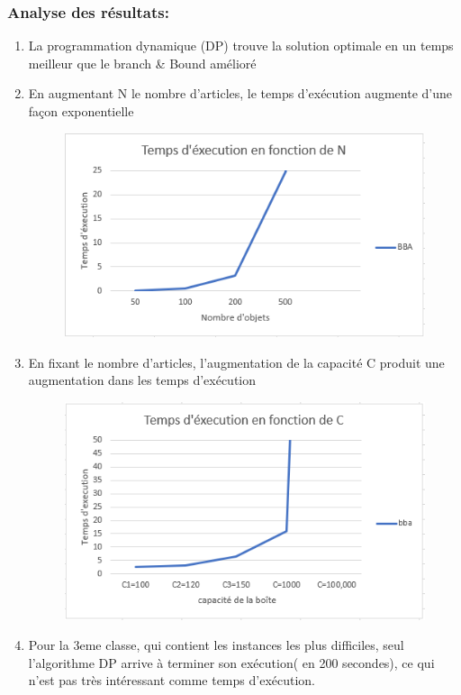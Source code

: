 \documentclass[12pt]{article}
\begin{document}
\subsubsection{Analyse des résultats:}
\begin{enumerate}
    \item La programmation dynamique (DP)  trouve la solution optimale en un temps meilleur que le branch \& Bound amélioré
    \item En augmentant N le nombre d’articles, le temps d'exécution augmente d’une façon exponentielle
    \begin{figure}[H]
        \includegraphics[width=13.5cm]{../figures/BBA_TEXEC_N.PNG}
    \end{figure}
    \item En fixant le nombre d’articles, l’augmentation de la capacité C produit une augmentation dans les temps d’exécution
    \begin{figure}[H]
        \includegraphics[width=13.5cm]{../figures/BBA_TEXEC_C.PNG}
    \end{figure}
    \item Pour la 3eme classe, qui contient les instances les plus difficiles, seul l’algorithme DP arrive à terminer son exécution( en 200 secondes), ce qui n’est pas très intéressant comme temps d'exécution.
\end{enumerate}
\end{document}
